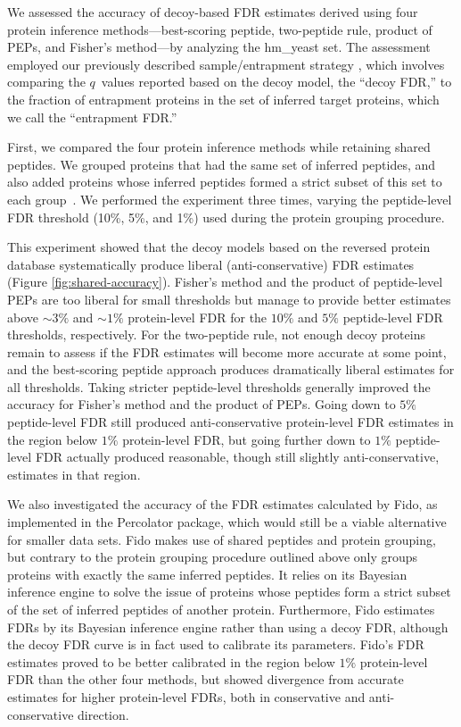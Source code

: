 \documentclass{article}
\begin{document}
We assessed the accuracy of decoy-based FDR estimates derived using
four protein inference methods---best-scoring peptide, two-peptide
rule, product of PEPs, and Fisher's method---by analyzing the
hm\_yeast set.  The assessment employed our previously described
sample/entrapment strategy \cite{granholm2013determining}, which
involves comparing the $q$~values reported based on the decoy model,
the ``decoy FDR,'' to the fraction of entrapment proteins in the set
of inferred target proteins, which we call the ``entrapment FDR.''

First, we compared the four protein inference methods while retaining
shared peptides. We grouped proteins that had the same set of
inferred peptides, and also added proteins whose inferred peptides
formed a strict subset of this set to each
group~\cite{nesvizhskii2005interpretation, serang2012review}.  We
performed the experiment three times, varying the peptide-level FDR
threshold (10\%, 5\%, and 1\%) used during the protein grouping
procedure.

This experiment showed that the decoy models based on the reversed 
protein database systematically produce liberal (anti-conservative) 
FDR estimates (Figure \ref{fig:shared-accuracy}). Fisher's method and 
the product of peptide-level PEPs are too liberal for small 
thresholds but manage to provide better estimates above ${\sim}3\%$ 
and ${\sim}1\%$ protein-level FDR for the $10\%$ and $5\%$ 
peptide-level FDR thresholds, respectively. For the two-peptide rule, 
not enough decoy proteins remain to assess if the FDR estimates will 
become more accurate at some point, and the best-scoring peptide 
approach produces dramatically liberal estimates for all thresholds. 
Taking stricter peptide-level thresholds generally improved the 
accuracy for Fisher's method and the product of PEPs. Going down to 
$5\%$ peptide-level FDR still produced anti-conservative protein-level 
FDR estimates in the region below $1\%$ protein-level FDR, but going 
further down to $1\%$ peptide-level FDR actually produced reasonable, 
though still slightly anti-conservative, estimates in that region.

We also investigated the accuracy of the FDR estimates calculated by 
Fido, as implemented in the Percolator package, which would still be a 
viable alternative for smaller data sets. Fido makes use of shared 
peptides and protein grouping, but contrary to the protein grouping 
procedure outlined above only groups proteins with exactly the 
same inferred peptides. It relies on its Bayesian inference engine to 
solve the issue of proteins whose peptides form a strict subset of the 
set of inferred peptides of another protein. Furthermore, Fido 
estimates FDRs by its Bayesian inference engine rather than using a 
decoy FDR, although the decoy FDR curve is in fact used to calibrate 
its parameters. Fido's FDR estimates proved to be better calibrated in 
the region below $1\%$ protein-level FDR than the other four methods, 
but showed divergence from accurate estimates for higher protein-level 
FDRs, both in conservative and anti-conservative direction.
\end{document}
